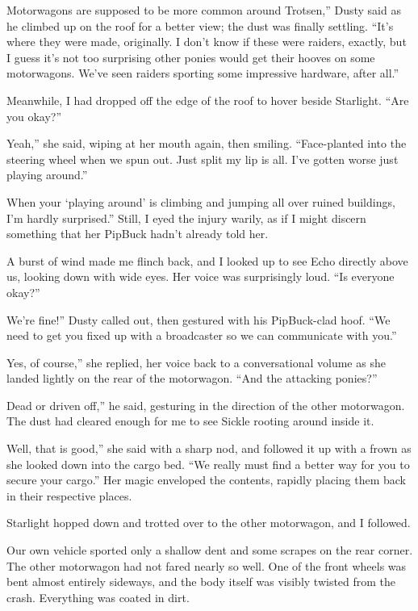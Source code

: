 \leavevmode{}Motorwagons are supposed to be more common around Trotsen,” Dusty said as he climbed up on the roof for a better view; the dust was finally settling. “It’s where they were made, originally. I don’t know if these were raiders, exactly, but I guess it’s not too surprising other ponies would get their hooves on some motorwagons. We’ve seen raiders sporting some impressive hardware, after all.”

Meanwhile, I had dropped off the edge of the roof to hover beside Starlight. “Are you okay?”

\leavevmode{}Yeah,” she said, wiping at her mouth again, then smiling. “Face-planted into the steering wheel when we spun out. Just split my lip is all. I’ve gotten worse just playing around.”

\leavevmode{}When your ‘playing around’ is climbing and jumping all over ruined buildings, I’m hardly surprised.” Still, I eyed the injury warily, as if I might discern something that her PipBuck hadn’t already told her.

A burst of wind made me flinch back, and I looked up to see Echo directly above us, looking down with wide eyes. Her voice was surprisingly loud. “Is everyone okay?”

\leavevmode{}We’re fine!” Dusty called out, then gestured with his PipBuck-clad hoof. “We need to get you fixed up with a broadcaster so we can communicate with you.”

\leavevmode{}Yes, of course,” she replied, her voice back to a conversational volume as she landed lightly on the rear of the motorwagon. “And the attacking ponies?”

\leavevmode{}Dead or driven off,” he said, gesturing in the direction of the other motorwagon. The dust had cleared enough for me to see Sickle rooting around inside it.

\leavevmode{}Well, that is good,” she said with a sharp nod, and followed it up with a frown as she looked down into the cargo bed. “We really must find a better way for you to secure your cargo.” Her magic enveloped the contents, rapidly placing them back in their respective places.

Starlight hopped down and trotted over to the other motorwagon, and I followed.

Our own vehicle sported only a shallow dent and some scrapes on the rear corner. The other motorwagon had not fared nearly so well. One of the front wheels was bent almost entirely sideways, and the body itself was visibly twisted from the crash. Everything was coated in dirt.


